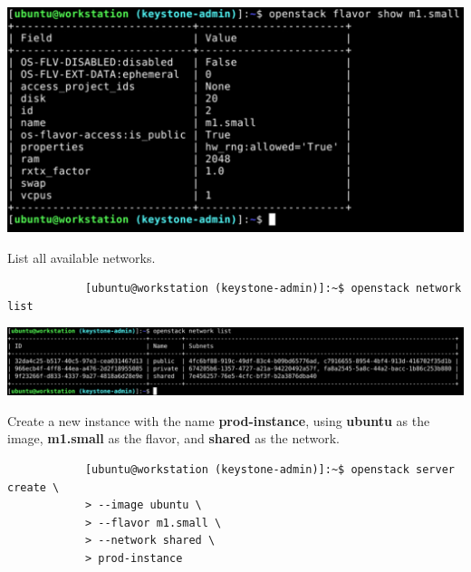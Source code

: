 \documentclass[letterpaper, 12pt]{article}
\begin{document}
\begin{enumerate}
\begin{labstep}
        \begin{center}
            \includegraphics[width=\linewidth]{images/part2/step5.png}
        \end{center}
    \end{labstep}

    \begin{labstep}
        List all available networks.
        \begin{lstlisting}
            [ubuntu@workstation (keystone-admin)]:~$ openstack network list
        \end{lstlisting}

        \begin{center}
            \includegraphics[width=\linewidth]{images/part2/step6.png}
        \end{center}
    \end{labstep}

    \begin{labstep}
        Create a new instance with the name \textbf{prod-instance}, using \textbf{ubuntu} as the image, \textbf{m1.small} as the flavor, and \textbf{shared} as the network.
        \begin{lstlisting}
            [ubuntu@workstation (keystone-admin)]:~$ openstack server create \
            > --image ubuntu \
            > --flavor m1.small \
            > --network shared \
            > prod-instance
        \end{lstlisting}


\end{labstep}
\end{enumerate}
\end{document}
